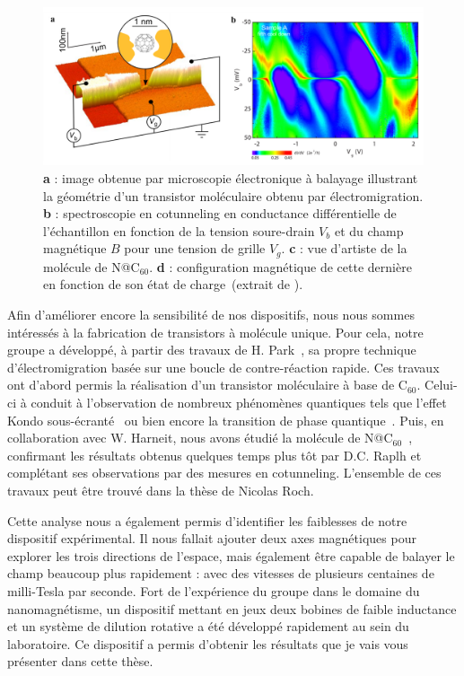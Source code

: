 \begin{figure}
\centering \includegraphics[scale=0.45]{Spintronique/RochC60/RochC60.pdf}
\caption{\textbf{a} : image obtenue par microscopie électronique à balayage illustrant la géométrie d'un transistor moléculaire obtenu par électromigration. \textbf{b} : spectroscopie en cotunneling en conductance différentielle de l'échantillon en fonction de la tension soure-drain $V_b$ et du champ magnétique $B$ pour une tension de grille $V_g$. \textbf{c} : vue d'artiste de la molécule de N@C$_{60}$. \textbf{d} : configuration magnétique de cette dernière en fonction de son état de charge~(extrait de \cite{Roch2011}).}
\label{RochC60}
\end{figure}


Afin d'améliorer encore la sensibilité de nos dispositifs, nous nous sommes intéressés à la fabrication de transistors à molécule unique. Pour cela, notre groupe a développé, à partir des travaux de H. Park~\cite{Park1999}, sa propre technique d'électromigration basée sur une boucle de contre-réaction rapide. Ces travaux ont d'abord permis la réalisation d'un transistor moléculaire à base de C$_{60}$. Celui-ci à conduit à l'observation de nombreux phénomènes quantiques tels que l'effet Kondo sous-écranté~\cite{Roch2009} ou bien encore la transition de phase quantique~\cite{Roch2008}. Puis, en collaboration avec W. Harneit, nous avons étudié la molécule de N@C$_{60}$~\cite{Roch2011}, confirmant les résultats obtenus quelques temps plus tôt par D.C. Raplh et complétant ses observations par des mesures en cotunneling. L'ensemble de ces travaux peut être trouvé dans la thèse de Nicolas Roch.


Cette analyse nous a également permis d'identifier les faiblesses de notre dispositif expérimental. Il nous fallait ajouter deux axes magnétiques pour explorer les trois directions de l'espace, mais également être capable de balayer le champ beaucoup plus rapidement : avec des vitesses de plusieurs centaines de milli-Tesla par seconde. Fort de l'expérience du groupe dans le domaine du nanomagnétisme, un dispositif mettant en jeux deux bobines de faible inductance et un système de dilution rotative a été développé rapidement au sein du laboratoire. Ce dispositif a permis d'obtenir les résultats que je vais vous présenter dans cette thèse.


